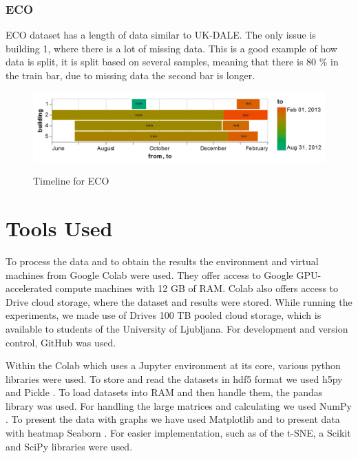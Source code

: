 \subsubsection{ECO}
ECO \cite{ECO} dataset has a length of data similar to UK-DALE. 
The only issue is building 1, where there is a lot of missing data.
This is a good example of how data is split, it is split based on several samples,
meaning that there is 80 \% in the train bar, due to missing data the second bar is longer. 

\begin{figure}[H]
	\centering
	\caption{Timeline for ECO}
	\includegraphics[width=1\textwidth]{Figures/EC/eco_timeline.png}
	\label{fig:eco_timeline}
\end{figure}


\section{Tools Used}



To process the data and to obtain the results the environment and virtual machines from Google Colab \cite{colab} were used.
They offer access to Google GPU-accelerated compute machines with 12 GB of RAM. 
Colab also offers access to Drive cloud storage, where the dataset and results were stored.
While running the experiments, we made use of Drives 100 TB pooled cloud storage, which is available to students of the University of Ljubljana. 
For development and version control, GitHub was used. 

Within the Colab which uses a Jupyter \cite{jupyter} environment at its core, various python libraries were used.
To store and read the datasets in hdf5 format we used h5py  \cite{hdf5} and Pickle  \cite{pickle}.
To load datasets into RAM and then handle them, the pandas  \cite{pandas} library was used.
For handling the large matrices and calculating we used NumPy  \cite{numpy}.
To present the data with graphs we have used Matplotlib  \cite{matplotlib} and to present data with heatmap Seaborn  \cite{seaborn}.
For easier implementation, such as of the t-SNE, a Scikit  \cite{scikit} and SciPy  \cite{scipy} libraries were used.
